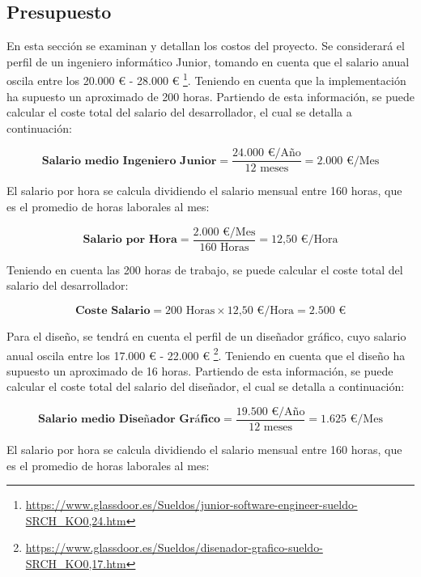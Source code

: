 \subsection{Presupuesto}

En esta sección se examinan y detallan los costos del proyecto. Se considerará el perfil de un ingeniero informático Junior, tomando en cuenta que el salario anual oscila entre los 20.000 € - 28.000 € \footnote{\url{https://www.glassdoor.es/Sueldos/junior-software-engineer-sueldo-SRCH_KO0,24.htm}}. Teniendo en cuenta que la implementación ha supuesto un aproximado de 200 horas. Partiendo de esta información, se puede calcular el coste total del salario del desarrollador, el cual se detalla a continuación:

\begin{equation}
    \textbf{Salario medio Ingeniero Junior} =  \frac {\text{24.000 €/Año} }{ \text{12 meses}} = \text{2.000 €/Mes}
\end{equation}

El salario por hora se calcula dividiendo el salario mensual entre 160 horas, que es el promedio de horas laborales al mes:

\begin{equation}
    \textbf{Salario por Hora} = \frac {\text{2.000 €/Mes}}{160 \text{ Horas}} = \text{12,50 €/Hora}
\end{equation}

Teniendo en cuenta las 200 horas de trabajo, se puede calcular el coste total del salario del desarrollador:

\begin{equation}
    \textbf{Coste Salario} = \text{200 Horas} \times \text{12,50 €/Hora} = \text{2.500 €}
\end{equation}

Para el diseño, se tendrá en cuenta el perfil de un diseñador gráfico, cuyo salario anual oscila entre los 17.000 € - 22.000 € \footnote{\url{https://www.glassdoor.es/Sueldos/disenador-grafico-sueldo-SRCH_KO0,17.htm}}. Teniendo en cuenta que el diseño ha supuesto un aproximado de 16 horas. Partiendo de esta información, se puede calcular el coste total del salario del diseñador, el cual se detalla a continuación:

\begin{equation}
    \textbf{Salario medio Diseñador Gráfico} =  \frac {\text{19.500 €/Año} }{ \text{12 meses}} = \text{1.625 €/Mes}
\end{equation}

El salario por hora se calcula dividiendo el salario mensual entre 160 horas, que es el promedio de horas laborales al mes:

